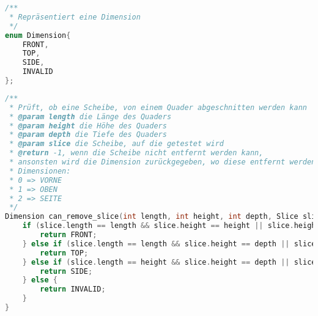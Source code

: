 \documentclass[a4paper,10pt,ngerman]{scrartcl}
\begin{document}
    \begin{lstlisting}[frame=single,language=C++,title=Enum Dimension,breaklines=true,label={lst:code_dimension}]
/**
 * Repräsentiert eine Dimension
 */
enum Dimension{
    FRONT,
    TOP,
    SIDE,
    INVALID
};
    \end{lstlisting}

    \begin{lstlisting}[frame=single,language=C++,title=Methode can\_remove\_slice,breaklines=true,label={lst:code_canRemoveSlice}]
/**
 * Prüft, ob eine Scheibe, von einem Quader abgeschnitten werden kann
 * @param length die Länge des Quaders
 * @param height die Höhe des Quaders
 * @param depth die Tiefe des Quaders
 * @param slice die Scheibe, auf die getestet wird
 * @return -1, wenn die Scheibe nicht entfernt werden kann,
 * ansonsten wird die Dimension zurückgegeben, wo diese entfernt werden kann
 * Dimensionen:
 * 0 => VORNE
 * 1 => OBEN
 * 2 => SEITE
 */
Dimension can_remove_slice(int length, int height, int depth, Slice slice) {
    if (slice.length == length && slice.height == height || slice.height == length && slice.length == height) {
        return FRONT;
    } else if (slice.length == length && slice.height == depth || slice.height == length && slice.length == depth) {
        return TOP;
    } else if (slice.length == height && slice.height == depth || slice.height == height && slice.length == depth) {
        return SIDE;
    } else {
        return INVALID;
    }
}
    \end{lstlisting}

    \newpage
\end{document}
